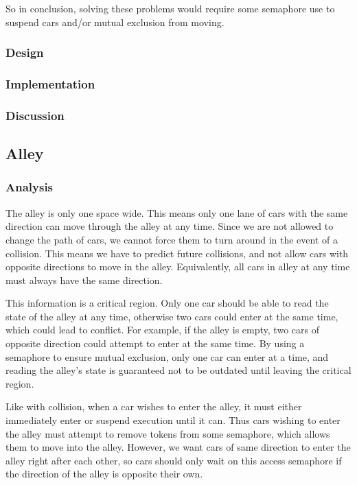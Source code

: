 So in conclusion, solving these problems would require some semaphore use to suspend cars and/or mutual exclusion from moving.

\subsubsection{Design}

\subsubsection{Implementation}

\subsubsection{Discussion}


\subsection{Alley}

\subsubsection{Analysis}
The alley is only one space wide. This means only one lane of cars with the same direction can move through the alley at any time. Since we are not allowed to change the path of cars, we cannot force them to turn around in the event of a collision. This means we have to predict future collisions, and not allow cars with opposite directions to move in the alley. Equivalently, all cars in alley at any time must always have the same direction.

This information is a critical region. Only one car should be able to read the state of the alley at any time, otherwise two cars could enter at the same time, which could lead to conflict. For example, if the alley is empty, two cars of opposite direction could attempt to enter at the same time. By using a semaphore to ensure mutual exclusion, only one car can enter at a time, and reading the alley's state is guaranteed not to be outdated until leaving the critical region.

Like with collision, when a car wishes to enter the alley, it must either immediately enter or suspend execution until it can. Thus cars wishing to enter the alley must attempt to remove tokens from some semaphore, which allows them to move into the alley. However, we want cars of same direction to enter the alley right after each other, so cars should only wait on this access semaphore if the direction of the alley is opposite their own.

